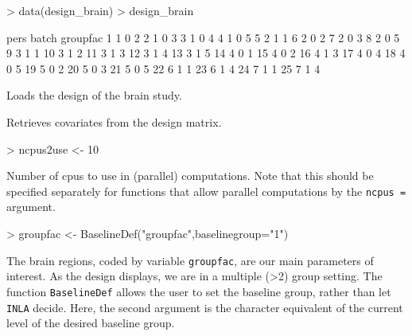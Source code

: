 \documentclass[11pt]{article}
\begin{document}
\begin{Schunk}
\begin{Sinput}
> data(design_brain)
> design_brain
\end{Sinput}
\begin{Soutput}
   pers batch groupfac
1     1     0        2
2     1     0        3
3     1     0        4
4     1     0        5
5     2     1        1
6     2     0        2
7     2     0        3
8     2     0        5
9     3     1        1
10    3     1        2
11    3     1        3
12    3     1        4
13    3     1        5
14    4     0        1
15    4     0        2
16    4     1        3
17    4     0        4
18    4     0        5
19    5     0        2
20    5     0        3
21    5     0        5
22    6     1        1
23    6     1        4
24    7     1        1
25    7     1        4
\end{Soutput}
\end{Schunk}
Loads the design of the brain study.

\begin{Schunk}
\end{Schunk}
Retrieves covariates from the design matrix.

\begin{Schunk}
\begin{Sinput}
> ncpus2use <- 10
\end{Sinput}
\end{Schunk}
Number of cpus to use in (parallel) computations. Note that this should be specified separately
for functions that allow parallel computations by the {\tt ncpus =} argument.

\begin{Schunk}
\begin{Sinput}
> groupfac <- BaselineDef("groupfac",baselinegroup="1")
\end{Sinput}
\end{Schunk}
The brain regions, coded by variable {\tt groupfac}, are our main parameters of interest.
As the design displays, we are in a multiple (>2) group setting. The function {\tt BaselineDef} allows the user to set
the baseline group, rather than let {\tt INLA} decide. Here, the second argument is the character equivalent of the current level
of the desired baseline group.
\end{document}
